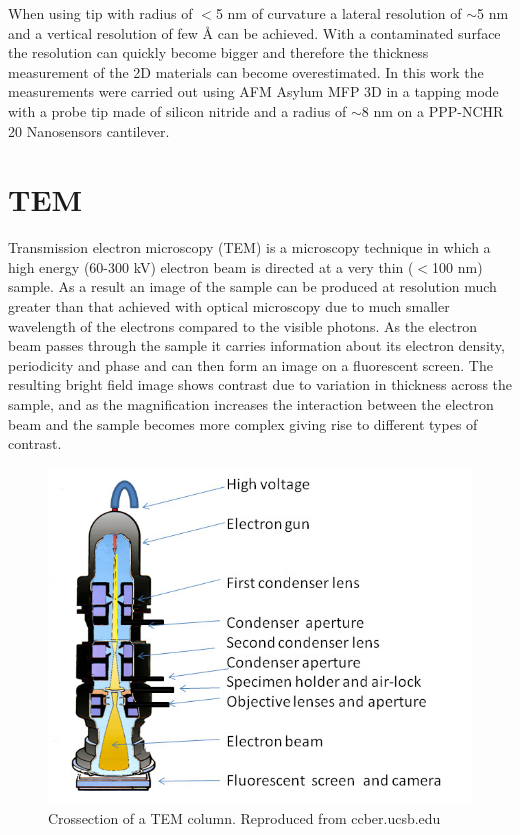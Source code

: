 When using tip with radius of $<$5 nm of curvature a lateral resolution of $\sim$5 nm and a vertical resolution of few \r{A} can be achieved. With a contaminated surface the resolution can quickly become bigger and therefore the thickness measurement of the 2D materials can become overestimated. In this work the measurements were carried out using AFM Asylum MFP 3D in a tapping mode with a probe tip made of silicon nitride and a radius of $\sim$8 nm on a PPP-NCHR 20 Nanosensors cantilever.

\section{TEM}

Transmission electron microscopy (TEM) is a microscopy technique in which a high energy (60-300 kV) electron beam is directed at a very thin ($<$100 nm) sample. As a result an image of the sample can be produced at resolution much greater than that achieved with optical microscopy due to much smaller wavelength of the electrons compared to the visible photons. As the electron beam passes through the sample it carries information about its electron density, periodicity and phase and can then form an image on a fluorescent screen. The resulting bright field image shows contrast due to variation in thickness across the sample, and as the magnification increases the interaction between the electron beam and the sample becomes more complex giving rise to different types of contrast. 

\begin{figure}[!ht]
	\begin{center}
		\includegraphics[scale=0.3]{Methodology/TEMSetup.png}
		\caption{Crossection of a TEM column. Reproduced from ccber.ucsb.edu}
		\label{fig:MethodologyTEMSetup}
	\end{center}
\end{figure}

